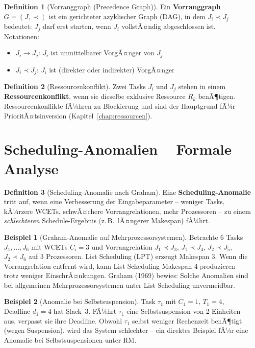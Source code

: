 ﻿\documentclass[a4paper,12pt]{report}
\theoremstyle{definition}
\newtheorem{definition}{Definition}[chapter]
\newtheorem{beispiel}{Beispiel}[chapter]
\begin{document}
\begin{definition}[Vorranggraph (Precedence Graph)]
	Ein \textbf{Vorranggraph} $G = (J, \prec)$ ist ein gerichteter azyklischer
	Graph (DAG), in dem $J_i \prec J_j$ bedeutet: $J_j$ darf erst starten,
	wenn $J_i$ vollstÃ¤ndig abgeschlossen ist. Notationen:
	\begin{itemize}
		\item $J_i \to J_j$: $J_i$ ist unmittelbarer VorgÃ¤nger von $J_j$
		\item $J_i \prec J_j$: $J_i$ ist (direkter oder indirekter) VorgÃ¤nger
	\end{itemize}
\end{definition}

\begin{definition}[Ressourcenkonflikt]
	Zwei Tasks $J_i$ und $J_j$ stehen in einem \textbf{Ressourcenkonflikt},
	wenn sie dieselbe exklusive Ressource $R_k$ benÃ¶tigen. Ressourcenkonflikte
	fÃ¼hren zu Blockierung und sind der Hauptgrund fÃ¼r PrioritÃ¤tsinversion
	(Kapitel~\ref{chap:ressourcen}).
\end{definition}

\section{Scheduling-Anomalien -- Formale Analyse}

\begin{definition}[Scheduling-Anomalie nach Graham]
	Eine \textbf{Scheduling-Anomalie} tritt auf, wenn eine Verbesserung der
	Eingabeparameter -- weniger Tasks, kÃ¼rzere WCETs, schwÃ¤chere Vorrangrelationen,
	mehr Prozessoren -- zu einem \emph{schlechteren} Schedule-Ergebnis (z.\,B.\
	lÃ¤ngerer Makespan) fÃ¼hrt.
\end{definition}

\begin{beispiel}[Graham-Anomalie auf Mehrprozessorsystemen]
	Betrachte 6 Tasks $J_1,\ldots,J_6$ mit WCETs $C_i = 3$ und Vorrangrelation
	$J_1 \prec J_3$, $J_1 \prec J_4$, $J_2 \prec J_5$, $J_2 \prec J_6$ auf
	3 Prozessoren. List Scheduling (LPT) erzeugt Makespan 3. Wenn die Vorrangrelation
	entfernt wird, kann List Scheduling Makespan 4 produzieren -- trotz weniger
	EinschrÃ¤nkungen. Graham (1969) bewies: Solche Anomalien sind bei allgemeinen
	Mehrprozessorsystemen unter List Scheduling unvermeidbar.
\end{beispiel}

\begin{beispiel}[Anomalie bei Selbstsuspension]
	Task $\tau_1$ mit $C_1=1$, $T_1=4$, Deadline $d_1=4$ hat Slack~3. FÃ¼hrt
	$\tau_1$ eine Selbstsuspension von 2 Einheiten aus, verpasst sie ihre Deadline.
	Obwohl $\tau_1$ selbst weniger Rechenzeit benÃ¶tigt (wegen Suspension), wird
	das System schlechter -- ein direktes Beispiel fÃ¼r eine Anomalie bei
	Selbstsuspensionen unter RM.
\end{beispiel}
\end{document}
